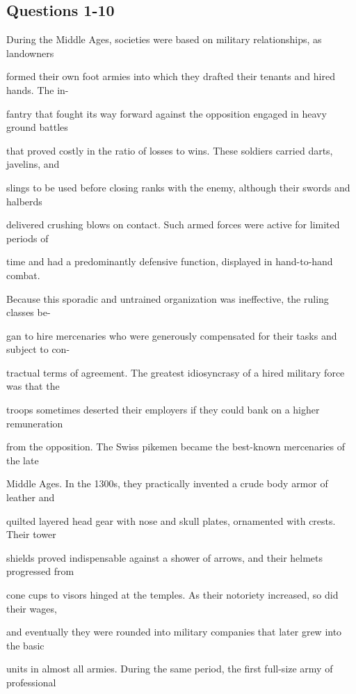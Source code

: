 \documentclass[12pt]{article}
\begin{document}
\subsection*{Questions 1-10}
\begingroup
\small
\sloppy
\setlength{\parskip}{0pt}
\setlength{\parindent}{0pt}
During the Middle Ages, societies were based on military relationships, as landowners\par
formed their own foot armies into which they drafted their tenants and hired hands. The in-\par
fantry that fought its way forward against the opposition engaged in heavy ground battles\par
that proved costly in the ratio of losses to wins. These soldiers carried darts, javelins, and\par
slings to be used before closing ranks with the enemy, although their swords and halberds\par
 delivered crushing blows on contact. Such armed forces were active for limited periods of\par
time and had a predominantly defensive function, displayed in hand-to-hand combat.\par
Because this sporadic and untrained organization was ineffective, the ruling classes be-\par
gan to hire mercenaries who were generously compensated for their tasks and subject to con-\par
tractual terms of agreement. The greatest idiosyncrasy of a hired military force was that the\par
troops sometimes deserted their employers if they could bank on a higher remuneration\par
from the opposition. The Swiss pikemen became the best-known mercenaries of the late\par
Middle Ages. In the 1300s, they practically invented a crude body armor of leather and\par
quilted layered head gear with nose and skull plates, ornamented with crests. Their tower\par
shields proved indispensable against a shower of arrows, and their helmets progressed from\par
cone cups to visors hinged at the temples. As their notoriety increased, so did their wages,\par
and eventually they were rounded into military companies that later grew into the basic\par
units in almost all armies. During the same period, the first full-size army of professional\par
\end{document}
